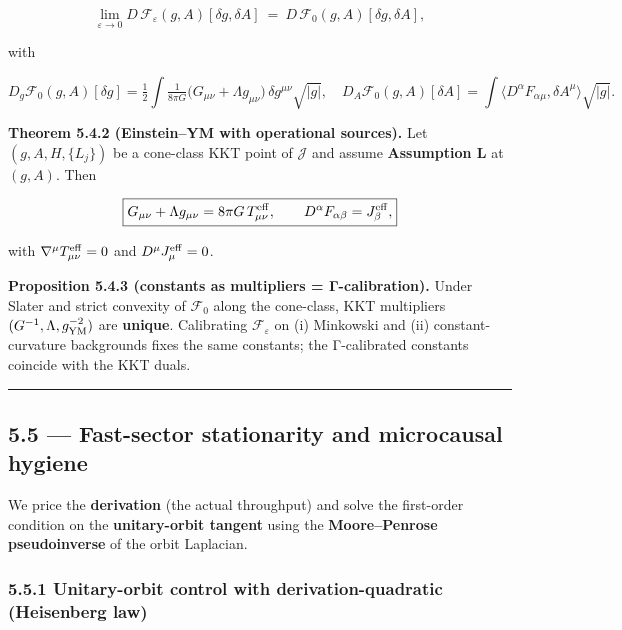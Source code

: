 \documentclass[
]{article}
\numberwithin{equation}{section}
\begin{document}
\[
\lim_{\varepsilon\to0} D\,\mathcal F_\varepsilon(g,A)[\delta g,\delta A]\ =\ D\,\mathcal F_0(g,A)[\delta g,\delta A],
\]

with

\[
D_g \mathcal F_0(g,A)[\delta g]=\tfrac12\!\int \!\tfrac{1}{8\pi G}\big(G_{\mu\nu}+\Lambda g_{\mu\nu}\big)\,\delta g^{\mu\nu}\sqrt{|g|},\quad
D_A \mathcal F_0(g,A)[\delta A]=\int\!\langle D^\alpha F_{\alpha\mu},\delta A^\mu\rangle\sqrt{|g|}.
\]

\textbf{Theorem 5.4.2 (Einstein--YM with operational sources).} Let
\((g,A,H,\{L_j\})\) be a cone-class KKT point of \(\mathcal J\) and
assume \textbf{Assumption L} at \((g,A)\). Then

\[
\boxed{
G_{\mu\nu}+\Lambda g_{\mu\nu}=8\pi G\,T^{\rm eff}_{\mu\nu},\qquad
D^\alpha F_{\alpha\beta}=J^{\rm eff}_\beta,
}
\]

with \(\nabla^\mu T^{\rm eff}_{\mu\nu}=0\) and
\(D^\mu J^{\rm eff}_\mu=0\).

\textbf{Proposition 5.4.3 (constants as multipliers = Γ-calibration).}
Under Slater and strict convexity of \(\mathcal F_0\) along the
cone-class, KKT multipliers \((G^{-1},\Lambda,g_{\rm YM}^{-2})\) are
\textbf{unique}. Calibrating \(\mathcal F_\varepsilon\) on (i) Minkowski
and (ii) constant-curvature backgrounds fixes the same constants; the
Γ-calibrated constants coincide with the KKT duals.

\begin{center}\rule{0.5\linewidth}{0.5pt}\end{center}

\hypertarget{fast-sector-stationarity-and-microcausal-hygiene}{%
\subsection{5.5 --- Fast-sector stationarity and microcausal
hygiene}\label{fast-sector-stationarity-and-microcausal-hygiene}}

We price the \textbf{derivation} (the actual throughput) and solve the
first-order condition on the \textbf{unitary-orbit tangent} using the
\textbf{Moore--Penrose pseudoinverse} of the orbit Laplacian.

\hypertarget{unitary-orbit-control-with-derivation-quadratic-heisenberg-law}{%
\subsubsection{5.5.1 Unitary-orbit control with derivation-quadratic
(Heisenberg
law)}\label{unitary-orbit-control-with-derivation-quadratic-heisenberg-law}}
\end{document}
